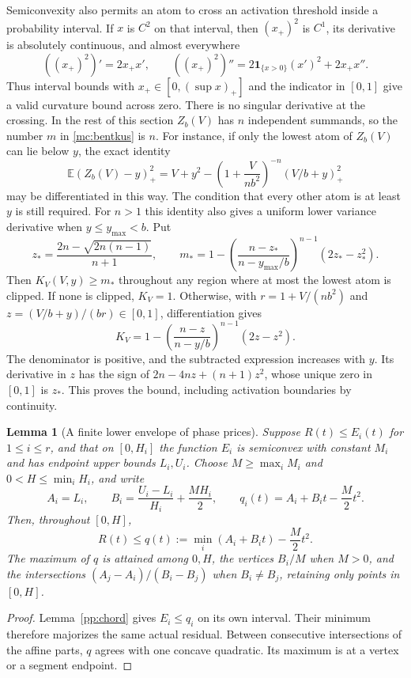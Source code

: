 \documentclass[aop,preprint]{imsart}
\newtheorem{lemma}[theorem]{Lemma}
\theoremstyle{definition}
\newcommand{\E}{\mathbb E}
\numberwithin{equation}{section}
\begin{document}
Semiconvexity also permits an atom to cross an activation threshold
inside a probability interval. If $x$ is $C^2$ on that interval,
then $(x_+)^2$ is $C^1$, its derivative is absolutely continuous,
and almost everywhere
\begin{equation}\label{pp:activation-curvature}
 ((x_+)^2)'=2x_+x',\qquad
 ((x_+)^2)''=2\mathbf1_{\{x>0\}}(x')^2+2x_+x''.
\end{equation}
Thus interval bounds with $x_+\in[0,(\sup x)_+]$ and the indicator
in $[0,1]$ give a valid curvature bound across zero.
There is no singular derivative at the crossing. In the rest of this
section $Z_b(V)$ has $n$ independent summands, so the number $m$
in \eqref{mc:bentkus} is $n$. For instance, if
only the lowest atom of $Z_b(V)$ can lie below $y$, the exact identity
\begin{equation}\label{pp:one-clip}
 \E(Z_b(V)-y)_+^2
 =V+y^2-\left(1+\frac{V}{nb^2}\right)^{-n}(V/b+y)_+^2
\end{equation}
may be differentiated in this way. The condition that every other
atom is at least $y$ is still required.
For $n>1$ this identity also gives a uniform lower variance derivative
when $y\le y_{\max}<b$. Put
\[
 z_* =\frac{2n-\sqrt{2n(n-1)}}{n+1},\qquad
 m_* =1-\left(\frac{n-z_*}{n-y_{\max}/b}\right)^{n-1}
                         (2z_*-z_*^2).
\]
Then $K_V(V,y)\ge m_*$ throughout any region where at most the
lowest atom is clipped. If none is clipped, $K_V=1$.
Otherwise, with $r=1+V/(nb^2)$ and
$z=(V/b+y)/(br)\in[0,1]$, differentiation gives
\[
 K_V=1-\left(\frac{n-z}{n-y/b}\right)^{n-1}(2z-z^2).
\]
The denominator is positive, and the subtracted expression increases
with $y$. Its derivative in
$z$ has the sign of $2n-4nz+(n+1)z^2$, whose unique zero in
$[0,1]$ is $z_*$. This proves the bound, including activation
boundaries by continuity.

\begin{lemma}[A finite lower envelope of phase prices]\label{pp:mixture}
Suppose $R(t)\le E_i(t)$ for $1\le i\le r$, and that on $[0,H_i]$
the function $E_i$ is semiconvex with constant $M_i$ and has
endpoint upper bounds $L_i,U_i$. Choose
$M\ge\max_i M_i$ and $0<H\le\min_i H_i$, and write
\[
 A_i=L_i,\qquad B_i=\frac{U_i-L_i}{H_i}+\frac{MH_i}{2},
 \qquad q_i(t)=A_i+B_it-\frac M2t^2.
\]
Then, throughout $[0,H]$,
\begin{equation}\label{pp:mixed-bound}
 R(t)\le q(t):=\min_i(A_i+B_it)-\frac M2t^2.
\end{equation}
The maximum of $q$ is attained among $0,H$, the vertices $B_i/M$
when $M>0$, and the intersections $(A_j-A_i)/(B_i-B_j)$ when
$B_i\ne B_j$, retaining only points in $[0,H]$.
\end{lemma}
\begin{proof}
Lemma~\ref{pp:chord} gives $E_i\le q_i$ on its own interval.
Their minimum therefore majorizes the same actual residual. Between
consecutive intersections of the affine parts, $q$ agrees with one
concave quadratic. Its maximum is at a vertex or a segment endpoint.
\end{proof}
\end{document}
